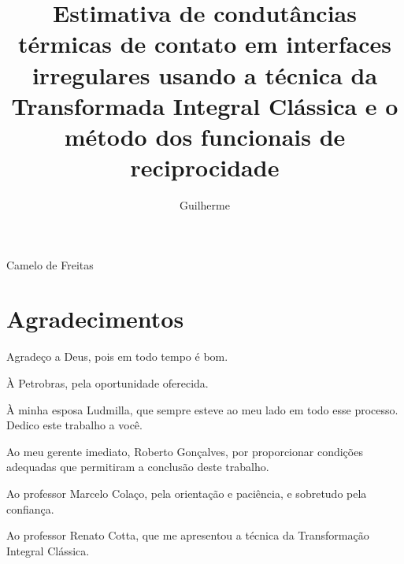 \documentclass[msc,numbers, fleqn]{coppe}
\numberwithin{figure}{section}
\numberwithin{table}{section}
\numberwithin{equation}{section}
\begin{document}


\title{Estimativa
de condutâncias térmicas de contato em interfaces irregulares usando a
técnica da Transformada Integral Clássica e o método dos funcionais de reciprocidade}
  \author{Guilherme}{Camelo de Freitas}
  \date{\month}{\the\year}
  
 
 \maketitle
 
 \frontmatter
  \dedication{À Ludmilla, minha esposa, minha companheira, minha amiga, minha âncora. Te amo!}
  
  \chapter*{Agradecimentos}
  
  Agradeço a Deus, pois em todo tempo é bom.
  
  À Petrobras, pela oportunidade oferecida.
  
  À minha esposa Ludmilla, que sempre esteve ao meu lado em todo esse processo. Dedico este trabalho a você.

  Ao meu gerente imediato, Roberto Gonçalves, por proporcionar condições adequadas que permitiram a conclusão deste trabalho.
  
  Ao professor Marcelo Colaço, pela orientação e paciência, e sobretudo pela confiança.
  
  Ao professor Renato Cotta, que me apresentou a técnica da Transformação Integral Clássica.
  
\end{document}
